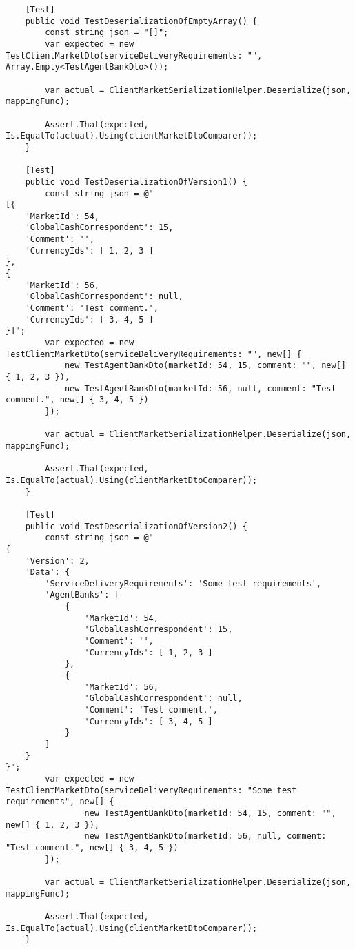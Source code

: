 \documentclass[a4paper,14pt]{extarticle}
\begin{document}
\begin{lstlisting}
    [Test]
    public void TestDeserializationOfEmptyArray() {
        const string json = "[]";
        var expected = new TestClientMarketDto(serviceDeliveryRequirements: "", Array.Empty<TestAgentBankDto>());

        var actual = ClientMarketSerializationHelper.Deserialize(json, mappingFunc);

        Assert.That(expected, Is.EqualTo(actual).Using(clientMarketDtoComparer));
    }

    [Test]
    public void TestDeserializationOfVersion1() {
        const string json = @"
[{
    'MarketId': 54,
    'GlobalCashCorrespondent': 15,
    'Comment': '',
    'CurrencyIds': [ 1, 2, 3 ]
},
{
    'MarketId': 56,
    'GlobalCashCorrespondent': null,
    'Comment': 'Test comment.',
    'CurrencyIds': [ 3, 4, 5 ]
}]";
        var expected = new TestClientMarketDto(serviceDeliveryRequirements: "", new[] {
            new TestAgentBankDto(marketId: 54, 15, comment: "", new[] { 1, 2, 3 }),
            new TestAgentBankDto(marketId: 56, null, comment: "Test comment.", new[] { 3, 4, 5 })
        });

        var actual = ClientMarketSerializationHelper.Deserialize(json, mappingFunc);

        Assert.That(expected, Is.EqualTo(actual).Using(clientMarketDtoComparer));
    }

    [Test]
    public void TestDeserializationOfVersion2() {
        const string json = @"
{
    'Version': 2,
    'Data': {
        'ServiceDeliveryRequirements': 'Some test requirements',
        'AgentBanks': [
            {
                'MarketId': 54,
                'GlobalCashCorrespondent': 15,
                'Comment': '',
                'CurrencyIds': [ 1, 2, 3 ]
            },
            {
                'MarketId': 56,
                'GlobalCashCorrespondent': null,
                'Comment': 'Test comment.',
                'CurrencyIds': [ 3, 4, 5 ]
            }
        ]
    }
}";
        var expected = new TestClientMarketDto(serviceDeliveryRequirements: "Some test requirements", new[] {
                new TestAgentBankDto(marketId: 54, 15, comment: "", new[] { 1, 2, 3 }),
                new TestAgentBankDto(marketId: 56, null, comment: "Test comment.", new[] { 3, 4, 5 })
        });

        var actual = ClientMarketSerializationHelper.Deserialize(json, mappingFunc);

        Assert.That(expected, Is.EqualTo(actual).Using(clientMarketDtoComparer));
    }


\end{lstlisting}
\end{document}
